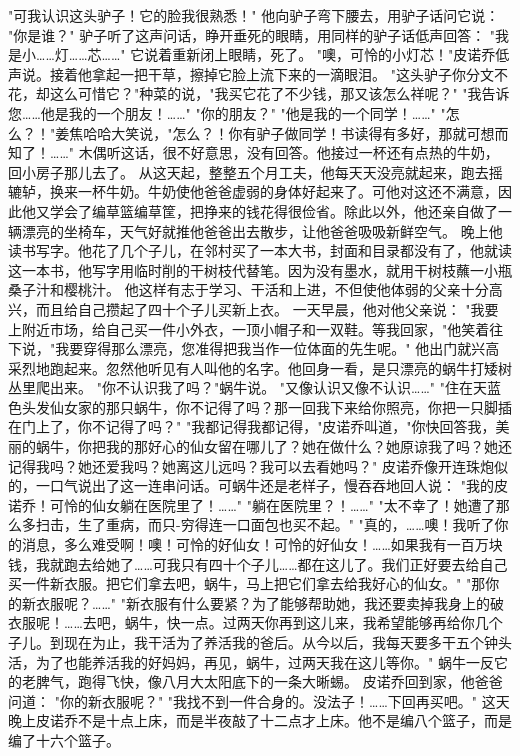 \documentclass[12pt,UTF8]{ctexbook}
\begin{document}
"可我认识这头驴子！它的脸我很熟悉！"
他向驴子弯下腰去，用驴子话问它说：
"你是谁？"
驴子听了这声问话，睁开垂死的眼睛，用同样的驴子话低声回答：
"我是小……灯……芯……"
它说着重新闭上眼睛，死了。
"噢，可怜的小灯芯！"皮诺乔低声说。接着他拿起一把干草，擦掉它脸上流下来的一滴眼泪。
"这头驴子你分文不花，却这么可惜它？"种菜的说，"我买它花了不少钱，那又该怎么祥呢？"
"我告诉您……他是我的一个朋友！……"
"你的朋友？"
"他是我的一个同学！……"
"怎么？！"姜焦哈哈大笑说，"怎么？！你有驴子做同学！书读得有多好，那就可想而知了！……"
木偶听这话，很不好意思，没有回答。他接过一杯还有点热的牛奶，回小房子那儿去了。
从这天起，整整五个月工夫，他每天天没亮就起来，跑去摇辘轳，换来一杯牛奶。牛奶使他爸爸虚弱的身体好起来了。可他对这还不满意，因此他又学会了编草篮编草筐，把挣来的钱花得很俭省。除此以外，他还亲自做了一辆漂亮的坐椅车，天气好就推他爸爸出去散步，让他爸爸吸吸新鲜空气。
晚上他读书写字。他花了几个子儿，在邻村买了一本大书，封面和目录都没有了，他就读这一本书，他写字用临时削的干树枝代替笔。因为没有墨水，就用干树枝蘸一小瓶桑子汁和樱桃汁。
他这样有志于学习、干活和上进，不但使他体弱的父亲十分高兴，而且给自己攒起了四十个子儿买新上衣。
一天早晨，他对他父亲说：
"我要上附近市场，给自己买一件小外衣，一顶小帽子和一双鞋。等我回家，"他笑着往下说，"我要穿得那么漂亮，您准得把我当作一位体面的先生呢。"
他出门就兴高采烈地跑起来。忽然他听见有人叫他的名字。他回身一看，是只漂亮的蜗牛打矮树丛里爬出来。
"你不认识我了吗？"蜗牛说。
"又像认识又像不认识……"
"住在天蓝色头发仙女家的那只蜗牛，你不记得了吗？那一回我下来给你照亮，你把一只脚插在门上了，你不记得了吗？"
"我都记得我都记得，"皮诺乔叫道，"你快回答我，美丽的蜗牛，你把我的那好心的仙女留在哪儿了？她在做什么？她原谅我了吗？她还记得我吗？她还爱我吗？她离这儿远吗？我可以去看她吗？"
皮诺乔像开连珠炮似的，一口气说出了这一连串问话。可蜗牛还是老样子，慢吞吞地回人说：
"我的皮诺乔！可怜的仙女躺在医院里了！……"
"躺在医院里？！……"
"太不幸了！她遭了那么多扫击，生了重病，而只-穷得连一口面包也买不起。"
"真的，……噢！我听了你的消息，多么难受啊！噢！可怜的好仙女！可怜的好仙女！……如果我有一百万块钱，我就跑去给她了……可我只有四十个子儿……都在这儿了。我们正好要去给自己买一件新衣服。把它们拿去吧，蜗牛，马上把它们拿去给我好心的仙女。"
"那你的新衣服呢？……"
"新衣服有什么要紧？为了能够帮助她，我还要卖掉我身上的破衣服呢！……去吧，蜗牛，快一点。过两天你再到这儿来，我希望能够再给你几个子儿。到现在为止，我干活为了养活我的爸后。从今以后，我每天要多干五个钟头活，为了也能养活我的好妈妈，再见，蜗牛，过两天我在这儿等你。"
蜗牛一反它的老脾气，跑得飞快，像八月大太阳底下的一条大晰蜴。
皮诺乔回到家，他爸爸问道：
"你的新衣服呢？"
"我找不到一件合身的。没法子！……下回再买吧。"
这天晚上皮诺乔不是十点上床，而是半夜敲了十二点才上床。他不是编八个篮子，而是编了十六个篮子。
\end{document}

